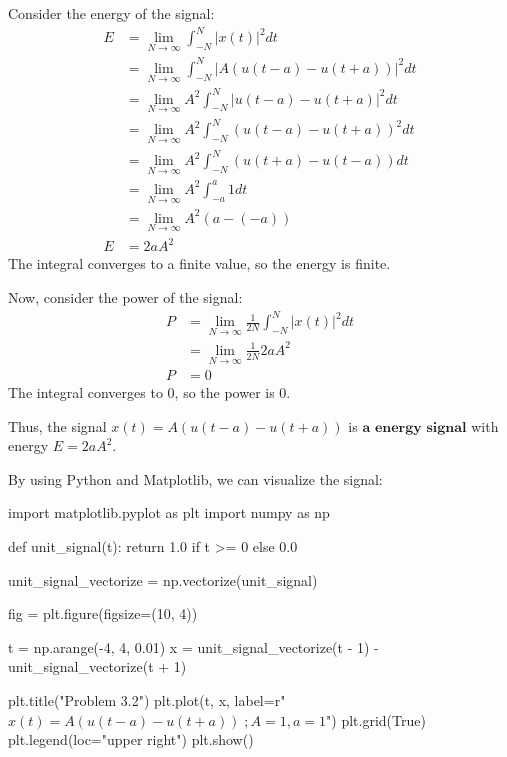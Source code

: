 \documentclass[a4paper, 10pt]{article}
\begin{document}
\begin{solution}
Consider the energy of the signal:
\begin{align*}
    E &= \lim_{N \to \infty} \int_{-N}^{N} |x(t)|^2 dt \\
    &= \lim_{N \to \infty} \int_{-N}^{N} |A(u(t-a) - u(t+a))|^2 dt \\
    &= \lim_{N \to \infty} A^2 \int_{-N}^{N} |u(t-a) - u(t+a)|^2 dt \\
    &= \lim_{N \to \infty} A^2 \int_{-N}^{N} (u(t-a) - u(t+a))^2 dt \\
    &= \lim_{N \to \infty} A^2 \int_{-N}^{N} (u(t+a) - u(t-a)) dt \\
    &= \lim_{N \to \infty} A^2 \int_{-a}^{a} 1 dt \\
    &= \lim_{N \to \infty} A^2 (a - (-a)) \\
    E &= 2aA^2
\end{align*}
The integral converges to a finite value, so the energy is finite.

\vspace{5mm}

Now, consider the power of the signal:
\begin{align*}
    P &= \lim_{N \to \infty} \frac{1}{2N} \int_{-N}^{N} |x(t)|^2 dt \\
    &= \lim_{N \to \infty} \frac{1}{2N} 2aA^2 \\
    P &= 0
\end{align*}
The integral converges to 0, so the power is 0.

\vspace{2mm}

Thus, the signal \( x(t) = A(u(t-a) - u(t+a)) \) is \( \boxed{\textbf{a energy signal}} \) with energy \( \boxed{E = 2aA^2} \).

\newpage

By using Python and Matplotlib, we can visualize the signal:
\begin{codingbox}
import matplotlib.pyplot as plt
import numpy as np

def unit_signal(t):
    return 1.0 if t >= 0 else 0.0

unit_signal_vectorize = np.vectorize(unit_signal)

fig = plt.figure(figsize=(10, 4))

t = np.arange(-4, 4, 0.01)
x = unit_signal_vectorize(t - 1) - unit_signal_vectorize(t + 1)

plt.title("Problem 3.2")
plt.plot(t, x, label=r"$x(t) = A\left(u(t-a) - u(t+a)\right) \;; A = 1, a = 1$")
plt.grid(True)
plt.legend(loc="upper right")
plt.show()
\end{codingbox}


\end{solution}
\end{document}
